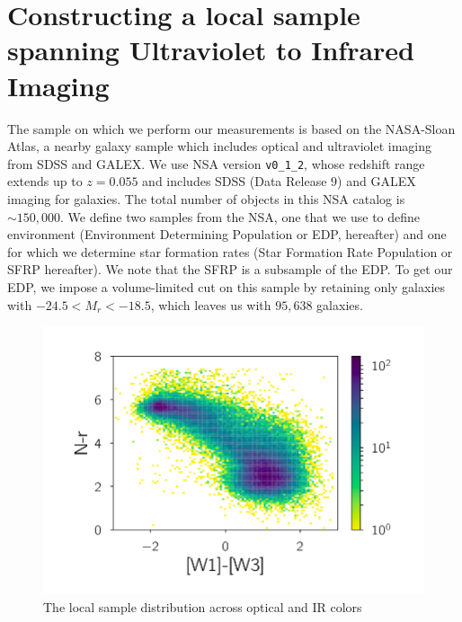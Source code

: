 \section{Constructing a local sample spanning Ultraviolet to Infrared Imaging}
The sample on which we perform our measurements is based on the NASA-Sloan Atlas, a nearby galaxy sample which includes optical and ultraviolet imaging from SDSS and GALEX. We use NSA version {\tt v0\_1\_2}, whose redshift range extends up to $z = 0.055$ and includes SDSS (Data Release $9$) and GALEX imaging for galaxies. The total number of objects in this NSA catalog is ${\sim}150,000$. We define two samples from the NSA, one that we use to define environment (Environment Determining Population or EDP, hereafter) and one for which we determine star formation rates (Star Formation Rate Population or SFRP hereafter). We note that the SFRP is a subsample of the EDP. To get our EDP, we impose a volume-limited cut on this sample by retaining only galaxies with $-24.5 <M_{r}< -18.5$, which leaves us with $95,638$ galaxies.\\

\begin{figure}
\includegraphics[width=\textwidth]{figures/sample}
\caption[Data: The local sample distribution across optical and IR colors]{The local sample distribution across optical and IR colors
\label{fig:sample}}
\end{figure}

